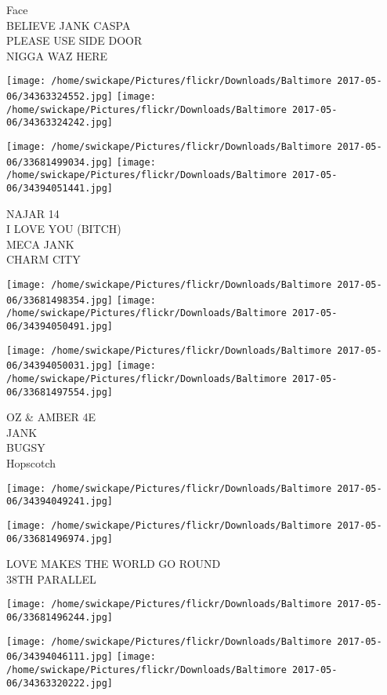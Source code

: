 \documentclass[10pt,letterpaper]{article}
\begin{document}
Face\\
BELIEVE JANK CASPA\\
PLEASE USE SIDE DOOR\\
NIGGA WAZ HERE\\
\pagebreak

\texttt{[image: /home/swickape/Pictures/flickr/Downloads/Baltimore 2017-05-06/34363324552.jpg]}
\texttt{[image: /home/swickape/Pictures/flickr/Downloads/Baltimore 2017-05-06/34363324242.jpg]}

\texttt{[image: /home/swickape/Pictures/flickr/Downloads/Baltimore 2017-05-06/33681499034.jpg]}
\texttt{[image: /home/swickape/Pictures/flickr/Downloads/Baltimore 2017-05-06/34394051441.jpg]}

NAJAR 14\\
I LOVE YOU (BITCH)\\
MECA JANK\\
CHARM CITY\\
\pagebreak

\texttt{[image: /home/swickape/Pictures/flickr/Downloads/Baltimore 2017-05-06/33681498354.jpg]}
\texttt{[image: /home/swickape/Pictures/flickr/Downloads/Baltimore 2017-05-06/34394050491.jpg]}

\texttt{[image: /home/swickape/Pictures/flickr/Downloads/Baltimore 2017-05-06/34394050031.jpg]}
\texttt{[image: /home/swickape/Pictures/flickr/Downloads/Baltimore 2017-05-06/33681497554.jpg]}

OZ \& AMBER 4E\\
JANK\\
BUGSY\\
Hopscotch\\
\pagebreak

\texttt{[image: /home/swickape/Pictures/flickr/Downloads/Baltimore 2017-05-06/34394049241.jpg]}

\vspace{0.25in}
\texttt{[image: /home/swickape/Pictures/flickr/Downloads/Baltimore 2017-05-06/33681496974.jpg]}

LOVE MAKES THE WORLD GO ROUND\\
38TH PARALLEL\\
\pagebreak

\texttt{[image: /home/swickape/Pictures/flickr/Downloads/Baltimore 2017-05-06/33681496244.jpg]}

\vspace{0.25in}
\texttt{[image: /home/swickape/Pictures/flickr/Downloads/Baltimore 2017-05-06/34394046111.jpg]}
\texttt{[image: /home/swickape/Pictures/flickr/Downloads/Baltimore 2017-05-06/34363320222.jpg]}
\end{document}

